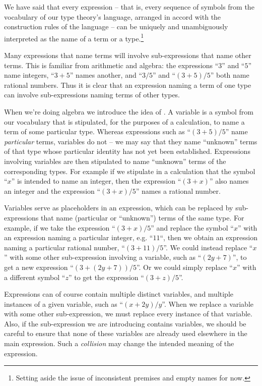 We have said that every expression -- that is, every sequence of symbols from the vocabulary of our type theory's language, arranged in accord with the construction rules of the language -- can be uniquely and unambiguously interpreted as the name of a term or a type.\footnote{
Setting aside the issue of inconsistent premises and empty names for now.
}

Many expressions that name terms will involve sub-expressions that name other terms.  This is familiar from arithmetic and algebra: 
the expressions ``$3$'' and ``$5$'' name integers, ``$3+5$'' names another, and ``$3/5$'' and ``$(3+5)/5$'' both name rational numbers.  Thus it is clear that an expression naming a term of one type can involve sub-expressions naming terms of other types.  

When we're doing algebra we introduce the idea of .  A variable is a symbol from our vocabulary that is stipulated, for the purposes of a calculation, to name a term of some particular type.  Whereas expressions such as ``$(3+5)/5$'' name \emph{particular} terms, variables do not -- we may say that they name ``unknown'' terms of that type whose particular identity has not yet been established.  Expressions involving variables are then stipulated to name ``unknown'' terms of the corresponding types.  For example if we stipulate in a calculation that the symbol ``$x$'' is intended to name an integer, then 
the expression ``$(3 + x)$'' also names an integer and the expression ``$(3 + x)/5$'' names a rational number.


Variables serve as placeholders in an expression, which can be replaced by sub-expressions that name (particular or ``unknown'') terms of the same type.
For example, if we take the expression ``$(3 + x)/5$'' and replace the symbol ``$x$'' with an expression naming a particular integer, e.g. ``$11$``, then we obtain an expression naming a particular rational number, ``$(3 + 11)/5$''.  We could instead replace ``$x$'' with some other sub-expression involving a variable, such as ``$(2y + 7)$'', to get a new expression ``$(3 + (2y + 7))/5$''.  Or we could simply replace 
``$x$'' with a different symbol ``$z$'' to get the expression ``$(3 + z)/5$''.

Expressions can of course contain multiple distinct variables, and multiple instances of a given variable, such as ``$(x + 2y)/y$''.  When we replace a variable with some other sub-expression, we must replace every instance of that variable.
Also, if the sub-expression we are introducing contains variables, we should be careful to ensure that none of these variables are already used elsewhere in the main expression.  Such a \emph{collision} may change the intended meaning of the expression.

